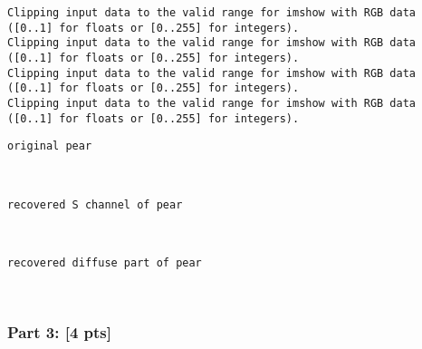 \documentclass[11pt]{article}
\begin{document}
    \begin{Verbatim}[commandchars=\\\{\}]
Clipping input data to the valid range for imshow with RGB data ([0..1] for floats or [0..255] for integers).
Clipping input data to the valid range for imshow with RGB data ([0..1] for floats or [0..255] for integers).
Clipping input data to the valid range for imshow with RGB data ([0..1] for floats or [0..255] for integers).
Clipping input data to the valid range for imshow with RGB data ([0..1] for floats or [0..255] for integers).

    \end{Verbatim}

    \begin{Verbatim}[commandchars=\\\{\}]
original pear

    \end{Verbatim}

    \begin{center}
    \end{center}
    { \hspace*{\fill} \\}
    
    \begin{Verbatim}[commandchars=\\\{\}]
recovered S channel of pear

    \end{Verbatim}

    \begin{center}
    \end{center}
    { \hspace*{\fill} \\}
    
    \begin{Verbatim}[commandchars=\\\{\}]
recovered diffuse part of pear

    \end{Verbatim}

    \begin{center}
    \end{center}
    { \hspace*{\fill} \\}
    
    \hypertarget{part-3-4-pts}{%
\subsubsection{Part 3: {[}4 pts{]}}\label{part-3-4-pts}}
\end{document}
